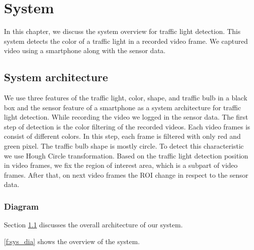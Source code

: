 \chapter{System}
\label{c:system}
In this chapter, we discuss the system overview for traffic light detection.
This system detects the color of a traffic light in a recorded video frame.
We captured video using a smartphone along with the sensor data.

\section{System architecture}
\label{s:archi}
We use three features of the traffic light, color, shape, and traffic bulb in a black box and the sensor feature of a smartphone as a system architecture for traffic light detection.
While recording the video we logged in the sensor data.
The first step of detection is the color filtering of the recorded videos.
Each video frames is consist of different colors.
In this step, each frame is filtered with only red and green pixel.
The traffic bulb shape is mostly circle.
To detect this characteristic we use Hough Circle  transformation\cite{hough_circle}.
Based on the traffic light detection position in video frames, we fix the region of interest area, which is a subpart of video frames.
After that, on next video frames the ROI change in respect to the sensor data. 

\subsection{Diagram}

Section \ref{s:archi} discusses the overall architecture of our system.

\ref{f:sys_dia} shows the overview of the system.


